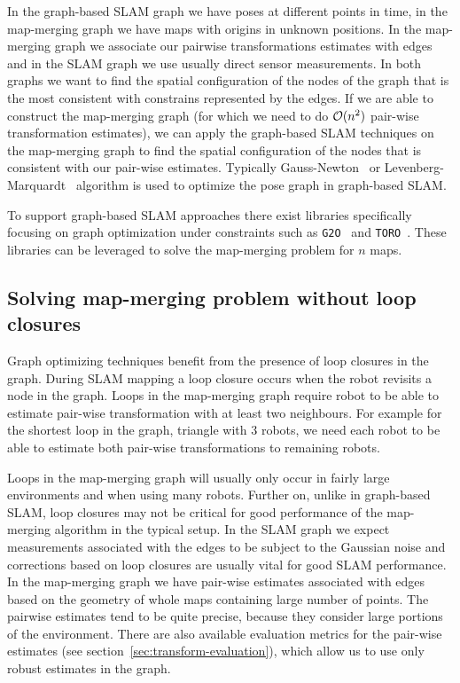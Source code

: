In the graph-based \gls{SLAM} graph we have poses at different points in time, in the map-merging graph we have maps with origins in unknown positions. In the map-merging graph we associate our pairwise transformations estimates with edges and in the \gls{SLAM} graph we use usually direct sensor measurements. In both graphs we want to find the spatial configuration of the nodes of the graph that is the most consistent with constrains represented by the edges. If we are able to construct the map-merging graph (for which we need to do $\operatorname{\mathcal{O}}(n^2)$ pair-wise transformation estimates), we can apply the graph-based \gls{SLAM} techniques on the map-merging graph to find the spatial configuration of the nodes that is consistent with our pair-wise estimates. Typically Gauss-Newton~\citet{fletcher2013practical} or Levenberg-Marquardt~\citet{more1978levmarq} algorithm is used to optimize the pose graph in graph-based \gls{SLAM}.

To support graph-based \gls{SLAM} approaches there exist libraries specifically focusing on graph optimization under constraints such as \texttt{G2O}~\citet{kummerle2011g2o} and \texttt{TORO}~\citet{grisetti2007toro}. These libraries can be leveraged to solve the map-merging problem for $n$ maps.

\subsection{Solving map-merging problem without loop closures}

Graph optimizing techniques benefit from the presence of loop closures in the graph. During \gls{SLAM} mapping a loop closure occurs when the robot revisits a node in the graph. Loops in the map-merging graph require robot to be able to estimate pair-wise transformation with at least two neighbours. For example for the shortest loop in the graph, triangle with $3$ robots, we need each robot to be able to estimate both pair-wise transformations to remaining robots.

Loops in the map-merging graph will usually only occur in fairly large environments and when using many robots. Further on, unlike in graph-based \gls{SLAM}, loop closures may not be critical for good performance of the map-merging algorithm in the typical setup. In the \gls{SLAM} graph we expect measurements associated with the edges to be subject to the Gaussian noise and corrections based on loop closures are usually vital for good \gls{SLAM} performance. In the map-merging graph we have pair-wise estimates associated with edges based on the geometry of whole maps containing large number of points. The pairwise estimates tend to be quite precise, because they consider large portions of the environment. There are also available evaluation metrics for the pair-wise estimates (see section~\ref{sec:transform-evaluation}), which allow us to use only robust estimates in the graph.

